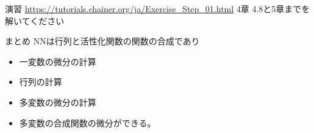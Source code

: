 \begin{frame}{演習}
\url{https://tutorials.chainer.org/ja/Exercise_Step_01.html}
4章 4.8と5章までを解いてください
\end{frame}

\begin{frame}{まとめ}
NNは行列と活性化関数の関数の合成であり
\begin{itemize}
   \item 一変数の微分の計算
   \item 行列の計算
   \item 多変数の微分の計算
   \item 多変数の合成関数の微分ができる。
\end{itemize}
    
\end{frame}
